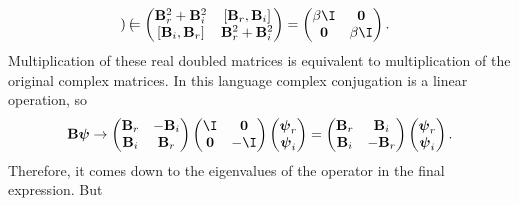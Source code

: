 \documentclass[11pt]{article}
\newcommand{\B}{\mathbf{B}}
\newcommand{\psib}{\boldsymbol{\psi}}
\begin{document}
\begin{equation*}
\begin{gathered}
\begin{pmatrix}
         \end{pmatrix}
  =
         \begin{pmatrix}
           \B_r^2 + \B_i^2 & [\B_r, \B_i]    \\
           [\B_i, \B_r]    & \B_r^2 + \B_i^2 \\
         \end{pmatrix}
  =
         \begin{pmatrix}
           \beta \I   & \mathbf{0} \\
           \mathbf{0} & \beta \I   \\
         \end{pmatrix}
  .
\end{gathered}
\end{equation*}
%
Multiplication of these real doubled matrices is equivalent to multiplication of the original complex matrices.
In this language complex conjugation is a linear operation, so
%
\begin{equation*}
  \B \psib \to
         \begin{pmatrix}
           \B_r & -\B_i \\
           \B_i &  \B_r \\
         \end{pmatrix}
         \begin{pmatrix}
           \I  & \mathbf{0} \\
           \mathbf{0} & -\I   \\
         \end{pmatrix}
         \begin{pmatrix}
           \psib_r \\
           \psib_i \\
         \end{pmatrix}
  =
         \begin{pmatrix}
           \B_r &  \B_i \\
           \B_i & -\B_r \\
         \end{pmatrix}
         \begin{pmatrix}
           \psib_r \\
           \psib_i \\
         \end{pmatrix}.
\end{equation*}
%
Therefore, it comes down to the eigenvalues of the operator in the final expression.
But
%
\end{document}
